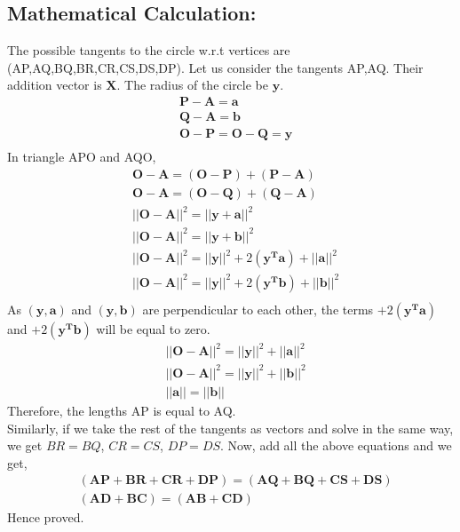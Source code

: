 \documentclass[a4paper,12pt,twocolumn]{article}
\let\vec\mathbf
\begin{document}
\subsection{Mathematical Calculation:}
The possible tangents to the circle w.r.t vertices are (AP,AQ,BQ,BR,CR,CS,DS,DP). Let us consider the tangents AP,AQ. Their addition vector is $\vec{X}$. The radius of the circle be $\vec{y}$.
\begin{align*}
&\vec{P-A} = \vec{a}\\
&\vec{Q-A} = \vec{b}\\
	&\vec{O-P} = \vec{O-Q} = \vec{y}\\
\end{align*}
In triangle APO and AQO,  
\begin{align*}
	&\vec{O-A}= \vec{(O-P)+(P-A)}\\
	&\vec{O-A}= \vec{(O-Q)+(Q-A)}\\
&||\vec{O-A}||^2 = ||\vec{y+a}||^2\\
	&||\vec{O-A}||^2 = ||\vec{y+b}||^2\\
	&||\vec{O-A}||^2 = ||\vec{y}||^2 +2(\vec{y^Ta}) +||\vec{a}||^2\\
&||\vec{O-A}||^2 = ||\vec{y}||^2 +2(\vec{y^Tb}) +||\vec{b}||^2\\
\end{align*}
As $\vec{(y,a)}$ and $\vec{(y,b)}$ are perpendicular to each other, the terms $+2(\vec{y^Ta})$ and $+2(\vec{y^Tb})$ will be equal to zero. 
\begin{align*}
&||\vec{O-A}||^2 = ||\vec{y}||^2 + ||\vec{a}||^2 \\
&||\vec{O-A}||^2 = ||\vec{y}||^2 + ||\vec{b}||^2\\
&||\vec{a}|| = ||\vec{b}||
\end{align*}
Therefore, the lengths AP is equal to AQ.\\
Similarly, if we take the rest of the tangents as vectors and solve in the same way, we get $BR = BQ$, $CR = CS$, $DP = DS$.
Now, add all the above equations and we get,
\begin{align*}
	&\vec{(AP+BR+CR+DP)} = \vec{(AQ+BQ+CS+DS)}\\
	&\vec{(AD+BC)} = \vec{(AB+CD)}
\end{align*}
Hence proved.
\end{document}
